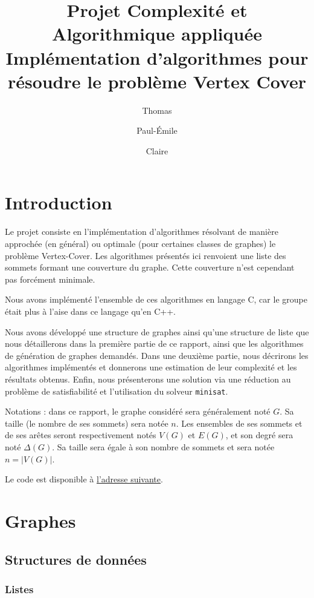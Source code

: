 \documentclass[a4paper,10pt]{article}
\title{Projet Complexité et Algorithmique appliquée\\ Implémentation d'algorithmes pour résoudre le problème Vertex Cover}
\author{Thomas \bsc{Bellitto}\and Paul-Émile \bsc{Boutoille} \and Claire \bsc{Pennarun}}
\date{}
\begin{document}
\maketitle

\section*{Introduction}

Le projet consiste en l'implémentation d'algorithmes résolvant de manière approchée (en général) ou optimale (pour certaines classes de graphes) le problème Vertex-Cover.
Les algorithmes présentés ici renvoient une liste des sommets formant une couverture du graphe. Cette couverture n'est cependant pas forcément minimale.

Nous avons implémenté l'ensemble de ces algorithmes en langage C, car le groupe était plus à l'aise dans ce langage qu'en C++.

Nous avons développé une structure de graphes ainsi qu'une structure de liste que nous détaillerons dans la première partie de ce rapport, ainsi que les algorithmes de génération de graphes demandés.
Dans une deuxième partie, nous décrirons les algorithmes implémentés et donnerons une estimation de leur complexité et les résultats obtenus.
Enfin, nous présenterons une solution via une réduction au problème de satisfiabilité et l'utilisation du solveur \texttt{minisat}.

Notations : dans ce rapport, le graphe considéré sera généralement noté $G$. Sa taille (le nombre de ses sommets) sera notée $n$. Les ensembles de ses sommets et de ses arêtes seront respectivement notés $V(G)$ et $E(G)$, et son degré sera noté $\Delta (G)$. Sa taille sera égale à son nombre de sommets et sera notée $n = |V(G)|$.

Le code est disponible à \href{http://github.com/ClairePennarun/CAA_Vertex_Cover }{l'adresse suivante}.

\section{Graphes}

\subsection{Structures de données}

\subsubsection{Listes}
\end{document}
